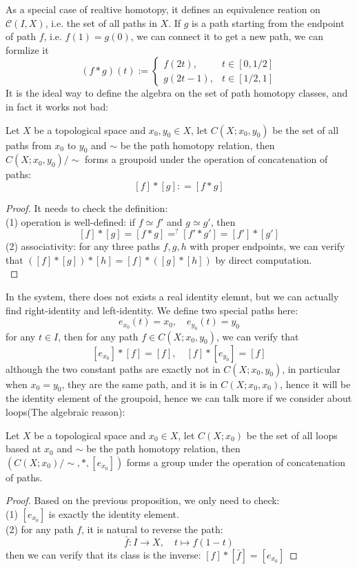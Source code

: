 \documentclass[12pt,a4paper]{article}
\begin{document}
As a special case of realtive homotopy, it defines an equivalence reation on \(\mathcal{C}(I,X)\), i.e. the set of all paths in \(X\). If \(g\) is a path starting from the endpoint of path \(f\), i.e. \(f(1) = g(0)\), we can connect it to get a new path, we can formlize it
\[(f*g)(t) := \begin{cases}
    f(2t), &t\in[0,1/2] \\
    g(2t-1), &t\in[1/2,1]
\end{cases}\]
It is the ideal way to define the algebra on the set of path homotopy classes, and in fact it works not bad:
\begin{proposition}
    Let \(X\) be a topological space and \(x_0,y_0 \in X\), let \(C(X;x_0,y_0)\) be the set of all paths from \(x_0\) to \(y_0\) and \(\sim \) be the path homotopy relation, then \(C(X;x_0,y_0)/\sim\) forms a groupoid under the operation of concatenation of paths:
    \[[f]*[g]: = [f*g]\]
\end{proposition}
\begin{proof}
    It needs to check the definition:\\
    (1) operation is well-defined: if \(f \simeq f'\) and \(g \simeq g'\), then \[[f]*[g] = [f*g] =^? [f'*g'] = [f']*[g']\]
    (2) associativity: for any three paths \(f,g,h\) with proper endpoints, we can verify that \(([f]*[g])*[h] = [f]*([g]*[h])\) by direct computation.\\
\end{proof}

In the system, there does not exists a real identity elemnt, but we can actually find right-identity and left-identity. We define two special paths here:
\[e_{x_0}(t) = x_0 ,\quad e_{y_0}(t) = y_0\]
for any \(t \in I\), then for any path \(f \in C(X;x_0,y_0)\), we can verify that
\[[e_{x_0}]*[f] = [f] ,\quad [f]*[e_{y_0}] = [f]\]
although the two constant paths are exactly not in \(C(X;x_0,y_0)\), in particular when \(x_0 = y_0\), they are the same path, and it is in \(C(X;x_0,x_0)\), hence it will be the identity element of the groupoid, hence we can talk more if we consider about loops(The algebraic reason):

\begin{proposition}
    Let \(X\) be a topological space and \(x_0 \in X\), let \(C(X;x_0)\) be the set of all loops based at \(x_0\) and \(\sim \) be the path homotopy relation, then \((C(X;x_0)/\sim, *, [e_{x_0}])\) forms a group under the operation of concatenation of paths.
\end{proposition}
\begin{proof}
    Based on the previous proposition, we only need to check:\\
    (1) \([e_{x_0}]\) is exactly the identity element.\\
    (2) for any path \(f\), it is natural to reverse the path:
    \[\bar{f}:I \to X, \quad t \mapsto f(1-t)\]
    then we can verify that its class is the inverse: \([f]*[\bar{f}] = [e_{x_0}]\)
\end{proof}
\end{document}
